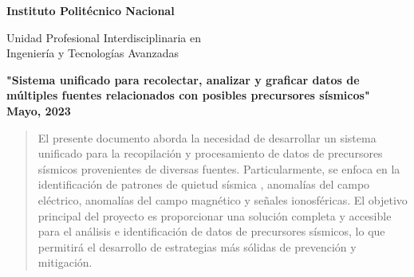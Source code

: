 \begin{titlepage}
         \begin{center}
            
              \vfill
              
            \begin{center}
                    {\Large \bf Instituto Politécnico Nacional }
                    
                    \vfill
                    
                    Unidad Profesional Interdisciplinaria en \\
                    Ingeniería y Tecnologías Avanzadas
                    
                    \vfill
            \end{center}
            
              \vfill
        
        
              \textbf{\Large "Sistema unificado para recolectar, analizar y graficar datos de múltiples fuentes relacionados con posibles precursores sísmicos"}\\[10pt]

            \vfill
            \textbf{Mayo, 2023}

 
        \end{center}
    \begin{abstract}
       El presente documento aborda la necesidad de desarrollar un sistema unificado para la recopilación y procesamiento de datos de precursores sísmicos provenientes de diversas fuentes. Particularmente, se enfoca en la identificación de patrones de quietud sísmica \cite{SSN}, anomalías del campo eléctrico, anomalías del campo magnético y señales ionosféricas. El objetivo principal del proyecto es proporcionar una solución completa y accesible para el análisis e identificación de datos de precursores sísmicos, lo que permitirá el desarrollo de estrategias más sólidas de prevención y mitigación.


\end{abstract}
\end{titlepage}
